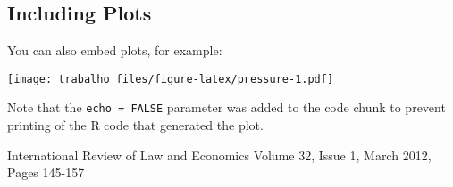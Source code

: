 \documentclass[]{article}
\begin{document}
\subsection{Including Plots}\label{including-plots}

You can also embed plots, for example:

\texttt{[image: trabalho\_files/figure-latex/pressure-1.pdf]}

Note that the \texttt{echo\ =\ FALSE} parameter was added to the code
chunk to prevent printing of the R code that generated the plot.

International Review of Law and Economics Volume 32, Issue 1, March
2012, Pages 145-157
\end{document}

